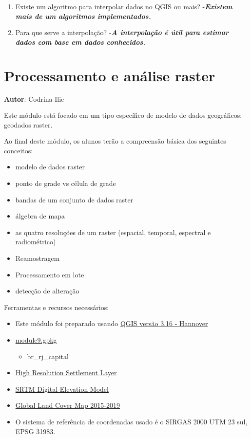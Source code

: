 \documentclass[
]{krantz}
\providecommand{\tightlist}{%
  \setlength{\itemsep}{0pt}\setlength{\parskip}{0pt}}
\begin{document}
\begin{enumerate}
\def\labelenumi{\arabic{enumi}.}
\item
  Existe um algoritmo para interpolar dados no QGIS ou mais? -\textbf{\emph{Existem mais de um algoritmos implementados.}}
\item
  Para que serve a interpolação? -\textbf{\emph{A interpolação é útil para estimar dados com base em dados conhecidos.}}
\end{enumerate}

\hypertarget{processamento-e-anuxe1lise-raster}{%
\chapter{Processamento e análise raster}\label{processamento-e-anuxe1lise-raster}}

\textbf{Autor}: Codrina Ilie

Este módulo está focado em um tipo específico de modelo de dados geográficos: geodados raster.

Ao final deste módulo, os alunos terão a compreensão básica dos seguintes conceitos:

\begin{itemize}
\tightlist
\item
  modelo de dados raster
\item
  ponto de grade vs célula de grade
\item
  bandas de um conjunto de dados raster
\item
  álgebra de mapa
\item
  as quatro resoluções de um raster (espacial, temporal, espectral e radiométrico)
\item
  Reamostragem
\item
  Processamento em lote
\item
  detecção de alteração
\end{itemize}

Ferramentas e recursos necessários:

\begin{itemize}
\tightlist
\item
  Este módulo foi preparado usando \href{https://qgis.org/en/site/forusers/download.html}{QGIS versão 3.16 - Hannover}
\item
  \href{data/module9/module9.gpkg}{module9.gpkg}

  \begin{itemize}
  \tightlist
  \item
    br\_rj\_capital
  \end{itemize}
\item
  \href{data/module9/hrsl_rj_capital_populacao.tif}{High Resolution Settlement Layer}
\item
  \href{data/module9/SRTM_DEM}{SRTM Digital Elevation Model}
\item
  \href{data/module9/Dynamic_Land_Cover_Map}{Global Land Cover Map 2015-2019}
\item
  O sistema de referência de coordenadas usado é o SIRGAS 2000 UTM 23 sul, EPSG 31983.
\end{itemize}
\end{document}
